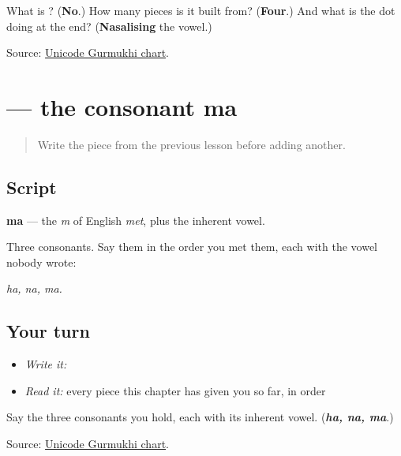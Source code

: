\begin{tcolorbox}[breakable,colback=teal!4,colframe=teal!35!black,title={Before you move on}]
What is \textbf{}? (\textbf{No}.) How many pieces is it built from? (\textbf{Four}.) And what is the dot doing at the end? (\textbf{Nasalising} the vowel.)

Source: \href{https://www.unicode.org/charts/PDF/U0A00.pdf}{Unicode Gurmukhi chart}.
\end{tcolorbox}
\section[\texorpdfstring{\pa{ਮ} (ma)}{ਮ (ma)}]{ — the consonant ma}

\label{lesson:PA-W01-ma}



\begin{quote}
Write the piece from the previous lesson before adding another.
\end{quote}

\subsection*{Script}

\begin{quote}
\end{quote}

\textbf{ma} — the \emph{m} of English \emph{met}, plus the inherent vowel.

Three consonants. Say them in the order you met them, each with the vowel nobody wrote:

\begin{quote}
\textbf{}   \textbf{}   \textbf{}
\end{quote}

\emph{ha, na, ma.}

\subsection*{Your turn}
\begin{itemize}
\raggedright
  \item \emph{Write it:} 
  \item \emph{Read it:} every piece this chapter has given you so far, in order
\end{itemize}

\begin{tcolorbox}[breakable,colback=teal!4,colframe=teal!35!black,title={Before you move on}]
Say the three consonants you hold, each with its inherent vowel. (\emph{\textbf{ha, na, ma}}.)

Source: \href{https://www.unicode.org/charts/PDF/U0A00.pdf}{Unicode Gurmukhi chart}.
\end{tcolorbox}
